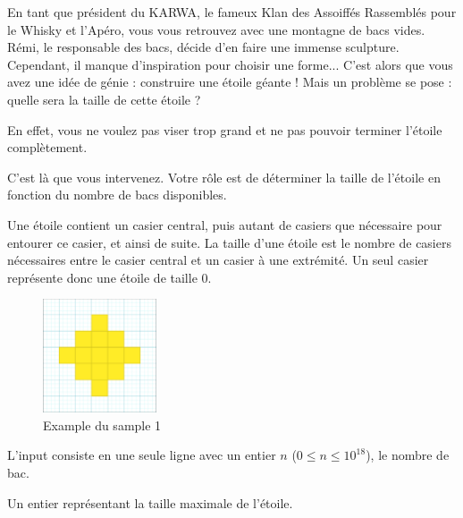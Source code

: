 \problemname{}


\newcommand{\maxn}{10^18}

En tant que président du KARWA, le fameux Klan des Assoiffés Rassemblés pour le Whisky et l'Apéro, vous vous retrouvez avec une montagne de bacs vides. Rémi, le responsable des bacs, décide d'en faire une immense sculpture. Cependant, il manque d'inspiration pour choisir une forme... 
C'est alors que vous avez une idée de génie : construire une étoile géante ! Mais un problème se pose : quelle sera la taille de cette étoile ?

En effet, vous ne voulez pas viser trop grand et ne pas pouvoir terminer l'étoile complètement.

C'est là que vous intervenez. Votre rôle est de déterminer la taille de l'étoile en fonction du nombre de bacs disponibles.

Une étoile contient un casier central, puis autant de casiers que nécessaire pour entourer ce casier, et ainsi de suite. La taille d'une étoile est le nombre de casiers nécessaires entre le casier central et un casier à une extrémité. Un seul casier représente donc une étoile de taille $0$.

\smallskip
\begin{figure}[h]
    \centering
    \includegraphics[width=0.3\textwidth]{example.png}
    \caption{Example du sample 1}
\end{figure}


\begin{Input}
    L'input consiste en une seule ligne avec un entier $n$ ($0\leq n\leq \maxn$), le nombre de bac.
\end{Input}

\begin{Output}
    Un entier représentant la taille maximale de l'étoile.
\end{Output}
